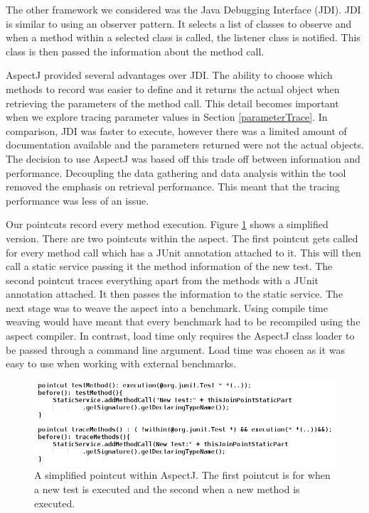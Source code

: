 The other framework we considered was the Java Debugging Interface (JDI). JDI is similar to using an observer pattern. It selects a list of classes to observe and when a method within a selected class is called, the listener class is notified. This class is then passed the information about the method call. 

AspectJ provided several advantages over JDI. The ability to choose which methods to record was easier to define and it returns the actual object when retrieving the parameters of the method call. This detail becomes important when we explore tracing parameter values in Section \ref{parameterTrace}. In comparison, JDI was faster to execute, however there was a limited amount of documentation available and the parameters returned were not the actual objects. The decision to use AspectJ was based off this trade off between information and performance. Decoupling the data gathering and data analysis within the tool removed the emphasis on retrieval performance. This meant that the tracing performance was less of an issue.

Our pointcuts record every method execution. Figure \ref{fig:aspectused} shows a simplified version. There are two pointcuts within the aspect. The first pointcut gets called for every method call which has a JUnit \@Test annotation attached to it. This will then call a static service passing it the method information of the new test. The second pointcut traces everything apart from the methods with a JUnit \@Test annotation attached. It then passes the information to the static service. The next stage was to weave the aspect into a benchmark. Using compile time weaving would have meant that every benchmark had to be recompiled using the aspect compiler. In contrast, load time only requires the AspectJ class loader to be passed through a command line argument. Load time was chosen as it was easy to use when working with external benchmarks.

\begin{figure}[h]
\begin{center}
\includegraphics[width = \textwidth]{aspect.png}
\end{center}
\caption{A simplified pointcut within AspectJ. The first pointcut is for when a new test is executed and the second when a new method is executed.}
\label{fig:aspectused}
\end{figure}

